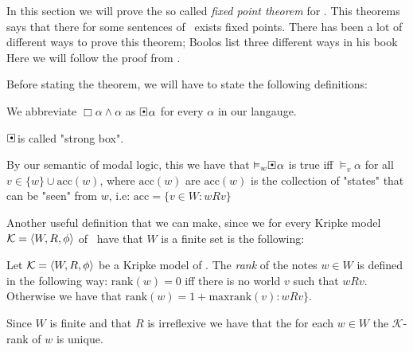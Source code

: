 \documentclass[../main.tex]{subfiles}
\begin{document}
In this section we will prove the so called \textit{fixed point theorem} for
\GL.  This theorems says that there for some sentences of \GL\ exists fixed
points. There has been a lot of different ways to prove this theorem; Boolos
list three different ways in his book \cite{Boolos1993} Here we
will follow the proof from \cite{Olson1990}.


Before stating the theorem, we will have to state the following 
definitions:

\begin{defi}
	We abbreviate $\Box\alpha\wedge\alpha$ as $\sBox\alpha$ for every
	$\alpha$ in our langauge.
\end{defi}
$\sBox$ is called "strong box".
\begin{remark}
	\label{rem:acc}
By our semantic of modal logic, this we have that $\vDash_w\sBox\alpha$ is true iff $\vDash_v\alpha$
for all $v\in\{w\}\cup\text{acc}(w)$, where $\text{acc}(w)$ are $\text{acc}(w)$
is the collection of "states" that can be "seen" from $w$, i.e:
$\text{acc}=\{v\in W:wRv\}$
\end{remark}
Another useful definition that we can make, since we for every Kripke model
$\mathcal{K}=\langle W,R,\phi\rangle$ of \GL\  have that $W$ is a finite set is the following:
\begin{defi}
	Let $\mathcal{K}=\langle W,R,\phi\rangle$ be a Kripke model of \GL. The
	\textit{rank} of the notes $w\in W$ is defined in the following
	way: $\text{rank}(w)=0$ iff there is no world $v$ such that
	$wRv$. Otherwise we have that
	$\text{rank}(w)=1+\text{max}\text{rank}(v):wRv\}$.
\end{defi}
Since $W$ is finite and that $R$ is irreflexive we have that the for each $w\in
W$ the $\mathcal{K}$-rank of $w$ is unique.
\end{document}
